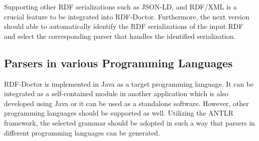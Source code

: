 Supporting other RDF serializations such as JSON-LD, and RDF/XML is a crucial feature to be integrated into RDF-Doctor. 
Furthermore, the next version should able to automatically identify the RDF serializations of the input RDF and select the corresponding parser that handles the identified serialization.     

\subsection{Parsers in various Programming Languages}

RDF-Doctor is implemented in Java as a target programming language.
It can be integrated as a self-contained module in another application which is also developed using Java or it can be used as a standalone software.  
However, other programming languages should be supported as well.
Utilizing the ANTLR framework, the selected grammar should be adopted in such a way that parsers in different programming languages can be generated.%


